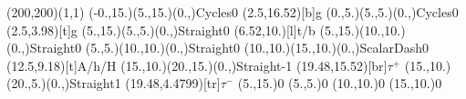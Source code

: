 \documentclass[12pt]{article}
\begin{document}
 
 \thispagestyle{empty}

\begin{feynartspicture}(200,200)(1,1)
\FADiagram{}
\FAProp(-0.,15.)(5.,15.)(0.,){Cycles}{0}
\FALabel(2.5,16.52)[b]{g}
\FAProp(0.,5.)(5.,5.)(0.,){Cycles}{0}
\FALabel(2.5,3.98)[t]{g}
\FAProp(5.,15.)(5.,5.)(0.,){Straight}{0}
\FALabel(6.52,10.)[l]{t/b}
\FAProp(5.,15.)(10.,10.)(0.,){Straight}{0}
\FAProp(5.,5.)(10.,10.)(0.,){Straight}{0}
\FAProp(10.,10.)(15.,10.)(0.,){ScalarDash}{0}
\FALabel(12.5,9.18)[t]{A/h/H}
\FAProp(15.,10.)(20.,15.)(0.,){Straight}{-1}
\FALabel(19.48,15.52)[br]{$\tau^+$}
\FAProp(15.,10.)(20.,5.)(0.,){Straight}{1}
\FALabel(19.48,4.4799)[tr]{$\tau^-$}
\FAVert(5.,15.){0}
\FAVert(5.,5.){0}
\FAVert(10.,10.){0}
\FAVert(15.,10.){0}
 \end{feynartspicture} 
 
\end{document}
